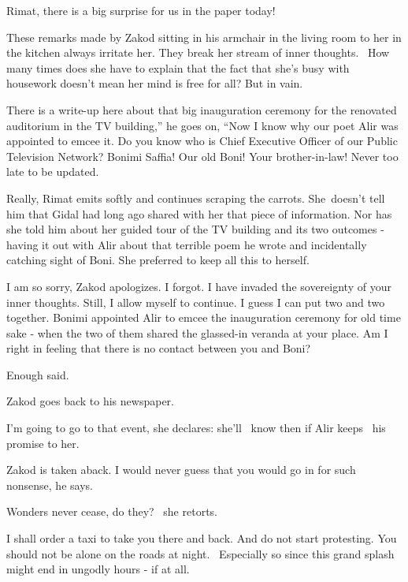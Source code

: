 \documentclass[letterpaper]{article}
\begin{document}
{\textquotedbl}Rimat, there is a big surprise for us in the paper today!{\textquotedbl}

These remarks made by Zakod sitting in his armchair in the living room to her in the kitchen always irritate her. They
break her stream of inner thoughts. \textcolor[rgb]{0.30980393,0.5058824,0.7411765}{\ }How many times does she have to
explain\textcolor[rgb]{0.0,0.6901961,0.9411765}{ }that the fact that she's busy with housework doesn't mean her mind is
free for all? But in vain. 

{\textquotedbl}There is a write-up here about that big inauguration ceremony for the renovated auditorium in the TV
building,'' he goes on, ``Now I know why our poet Alir was appointed to emcee it. Do you know who is Chief Executive
Officer of our Public Television Network? Bonimi Saffia! Our old Boni! Your brother-in-law! Never too late to be
updated.{\textquotedbl} 

{\textquotedbl}Really,{\textquotedbl} Rimat emits softly and continues scraping the carrots. She~doesn't tell him that
Gidal had long ago shared with her that piece of information. Nor has she told him about her guided tour of the TV
building and its two outcomes - having it out with Alir about that terrible poem he wrote and incidentally catching
sight of Boni. She preferred to keep all this to herself. ~

{\textquotedbl}I am so sorry,{\textquotedbl} Zakod apologizes. {\textquotedbl}I forgot. I have invaded the sovereignty
of your inner thoughts. Still, I allow myself to continue. I guess I can put two and two together. Bonimi appointed
Alir to emcee the inauguration ceremony for old time sake - when the two of them shared the glassed-in veranda at your
place. Am I right in feeling that there is no contact between you and Boni?{\textquotedbl}

{\textquotedbl}Enough said.{\textquotedbl} 

Zakod goes back to his newspaper. 

{\textquotedbl}I'm going to go to that event,{\textquotedbl} she declares: she'll \ know then if Alir keeps \ his
promise to her.\textcolor[rgb]{0.0,0.6901961,0.9411765}{ }

Zakod is taken aback. {\textquotedbl}I would never guess that you would go in for such nonsense,{\textquotedbl} he says.

{\textquotedbl}Wonders never cease, do they?{\textquotedbl} \ she retorts. 

{\textquotedbl}I shall order a taxi to take you there and back. And do not start protesting. You should not be alone on
the roads at night. ~Especially so since this grand splash might end in ungodly hours - if at all.{\textquotedbl}~ 
\end{document}
